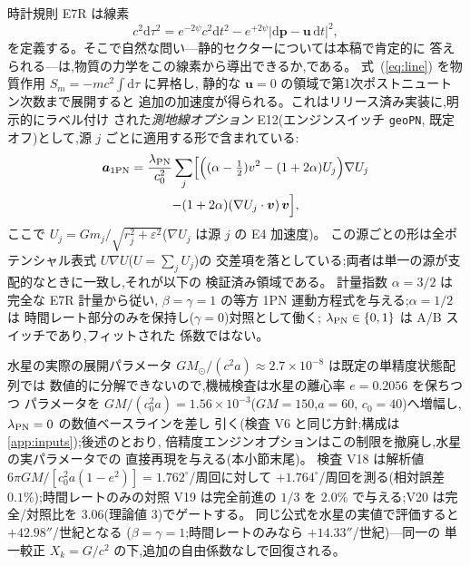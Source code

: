 \documentclass[a4paper,10pt,twocolumn]{ltjsarticle}
\newcommand{\ud}{\mathrm{d}}
\newcommand{\vect}[1]{\bm{#1}}
\newcommand{\Kt}{X_k}
\begin{document}
時計規則 E7R は線素
\begin{equation}
c^2\ud\tau^2 = e^{-2\psi}c^2\ud t^2
 - e^{+2\psi}\left|\ud\vect{p}-\vect{u}\,\ud t\right|^2 ,
\label{eq:line}
\end{equation}
を定義する。そこで自然な問い---静的セクターについては本稿で肯定的に
答えられる---は,物質の力学をこの線素から導出できるか,である。
式~(\ref{eq:line}) を物質作用 $S_m = -mc^2\!\int\!\ud\tau$ に昇格し,
静的な $\vect{u} = 0$ の領域で第1次ポストニュートン次数まで展開すると
追加の加速度が得られる。これはリリース済み実装に,明示的にラベル付け
された\emph{測地線オプション} E12(エンジンスイッチ \texttt{geoPN},
既定オフ)として,源 $j$ ごとに適用する形で含まれている:
\begin{multline}
\vect{a}_{\rm 1PN} = \frac{\lambda_{\rm PN}}{c_0^2}\sum_j
 \Bigl[\Bigl((\alpha-\tfrac12)v^2 - (1+2\alpha)U_j\Bigr)\nabla U_j\\
 - (1+2\alpha)(\nabla U_j\cdot\vect{v})\,\vect{v}\Bigr],
\label{eq:e12}
\end{multline}
ここで $U_j = Gm_j/\sqrt{r_j^2+\varepsilon^2}$($\nabla U_j$ は源 $j$ の
E4 加速度)。
この源ごとの形は全ポテンシャル表式 $U\nabla U$($U = \sum_j U_j$)の
交差項を落としている;両者は単一の源が支配的なときに一致し,それが以下の
検証済み領域である。
計量指数 $\alpha = 3/2$ は完全な E7R 計量から従い,
$\beta = \gamma = 1$ の等方 1PN 運動方程式を与える;$\alpha = 1/2$ は
時間レート部分のみを保持し($\gamma = 0$)対照として働く;
$\lambda_{\rm PN} \in \{0,1\}$ は A/B スイッチであり,フィットされた
係数ではない。

水星の実際の展開パラメータ
$GM_\odot/(c^2a) \approx 2.7\times10^{-8}$ は既定の単精度状態配列では
数値的に分解できないので,機械検査は水星の離心率 $e = 0.2056$ を保ちつつ
パラメータを $GM/(c_0^2a) = 1.56\times10^{-3}$($GM = 150$,$a = 60$,
$c_0 = 40$)へ増幅し,$\lambda_{\rm PN} = 0$ の数値ベースラインを差し
引く(検査 V6 と同じ方針;構成は\ref{app:inputs});後述のとおり,
倍精度エンジンオプションはこの制限を撤廃し,水星の実パラメータでの
直接再現を与える(本小節末尾)。
検査 V18 は解析値 $6\pi GM/[c_0^2a(1-e^2)] = 1.762^\circ$/周回に対して
$+1.764^\circ$/周回を測る(相対誤差 $0.1\%$);時間レートのみの対照
V19 は完全前進の $1/3$ を $2.0\%$ で与える;V20 は完全/対照比を
$3.06$(理論値 $3$)でゲートする。
同じ公式を水星の実値で評価すると $+42.98''$/世紀となる
($\beta = \gamma = 1$;時間レートのみなら $+14.33''$/世紀)---同一の
単一較正 $\Kt = G/c^2$ の下,追加の自由係数なしで回復される。
\end{document}
